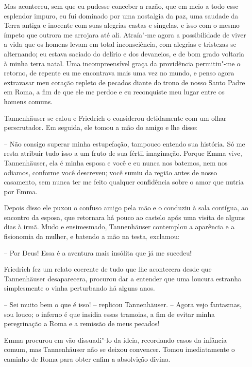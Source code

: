 Mas aconteceu, sem que eu pudesse conceber a razão, que em meio a todo
esse esplendor impuro, eu fui dominado por uma nostalgia da paz, uma
saudade da Terra antiga e inocente com suas alegrias castas e singelas,
e isso com o mesmo ímpeto que outrora me arrojara até ali. Atraía"-me
agora a possibilidade de viver a vida que os homens levam em total
inconsciência, com alegrias e tristezas se alternando; eu estava
saciado do delírio e dos devaneios, e de bom grado voltaria à minha terra
natal. Uma incompreensível graça da providência permitiu"-me o retorno,
de repente eu me encontrava mais uma vez no mundo, e penso agora
extravasar meu coração repleto de pecados diante do trono de nosso
Santo Padre em Roma, a fim de que ele me perdoe e eu reconquiste meu
lugar entre os homens comuns.

Tannenhäuser se calou e Friedrich o considerou detidamente com um
olhar perscrutador. Em seguida, ele tomou a mão do amigo e lhe disse:

-- Não consigo superar minha estupefação, tampouco entendo sua história.
Só me resta atribuir tudo isso a um fruto de sua fértil imaginação.
Porque Emma vive, Tannenhäuser, ela é minha esposa e você e eu nunca
nos batemos, nem nos odiamos, conforme você descreveu; você sumiu da
região antes de nosso casamento, sem nunca ter me feito qualquer
confidência sobre o amor que nutria por Emma.

Depois disso ele puxou o confuso amigo pela mão e o conduziu à sala
contígua, ao encontro da esposa, que retornara há pouco ao castelo após
uma visita de alguns dias à irmã. Mudo e ensimesmado, 
Tannenhäuser contemplou a aparência e a fisionomia da mulher, e batendo
a mão na testa, exclamou:

-- Por Deus! Essa é a aventura mais insólita que já me sucedeu!

Friedrich fez um relato coerente de tudo que lhe acontecera desde que
Tannenhäuser desaparecera, procurou dar a entender que uma loucura
estranha simplesmente o vinha perturbando há alguns anos.

-- Sei muito bem o que é isso! -- replicou Tannenhäuser. -- Agora vejo
fantasmas, sou louco; o inferno é que insidia essas tramoias, a fim de
evitar minha peregrinação a Roma e a remissão de meus pecados!

Emma procurou em vão dissuadi"-lo da ideia, recordando casos da infância
comum, mas Tannenhäuser não se deixou convencer. Tomou imediatamente
o caminho de Roma para obter enfim a absolvição divina.

